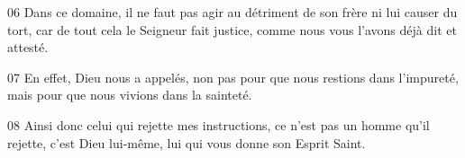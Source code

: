 
06 Dans ce domaine, il ne faut pas agir au détriment de son frère ni lui causer du tort, car de tout cela le Seigneur fait justice, comme nous vous l’avons déjà dit et attesté.

07 En effet, Dieu nous a appelés, non pas pour que nous restions dans l’impureté, mais pour que nous vivions dans la sainteté.

08 Ainsi donc celui qui rejette mes instructions, ce n’est pas un homme qu’il rejette, c’est Dieu lui-même, lui qui vous donne son Esprit Saint.

